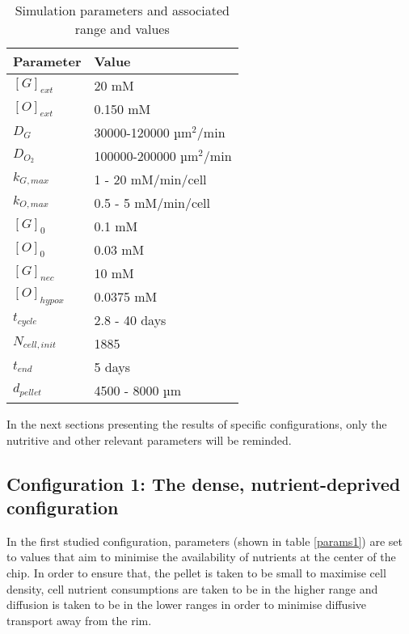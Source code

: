 \documentclass[11pt,a4paper]{article}
\begin{document}
\begin{table}[h!]
\begin{center}
\begin{tabular}{ |p{20mm}|p{45mm}| }
\hline 
\textbf{Parameter} & \textbf{Value}\\
\hline
\hline
$[G]_{ext}$ & 20 mM \\
\hline
$[O]_{ext}$ & 0.150 mM\\
\hline
$D_{G}$ & 30000-120000 µm$^2$/min \\
\hline
$D_{O_2}$ & 100000-200000 µm$^2$/min \\
\hline
$k_{G,max}$ & 1 - 20 mM/min/cell \\
\hline
$k_{O,max}$ & 0.5 - 5 mM/min/cell \\
\hline
$[G]_{0}$ & 0.1 mM\\
\hline
$[O]_{0}$ & 0.03 mM\\
\hline
$[G]_{nec}$ & 10 mM\\
\hline
$[O]_{hypox}$ & 0.0375 mM\\
\hline 
$t_{cycle}$ & 2.8 - 40 days\\
\hline
$N_{cell,init}$ & 1885\\
\hline
$t_{end}$ & 5 days\\
\hline
$d_{pellet}$ & 4500 - 8000 µm\\
\hline
\end{tabular}
\caption{Simulation parameters and associated range and values \label{params}}   
\end{center}
\end{table}
In the next sections presenting the results of specific configurations, only the nutritive and other relevant parameters will be reminded.

\newpage
\subsection{Configuration 1: The dense, nutrient-deprived configuration}
In the first studied configuration, parameters (shown in table \ref{params1}) are set to values that aim to minimise the availability of nutrients at the center of the chip. In order to ensure that, the pellet is taken to be small to maximise cell density, cell nutrient consumptions are taken to be in the higher range and diffusion is taken to be in the lower ranges in order to minimise diffusive transport away from the rim.
\end{document}
